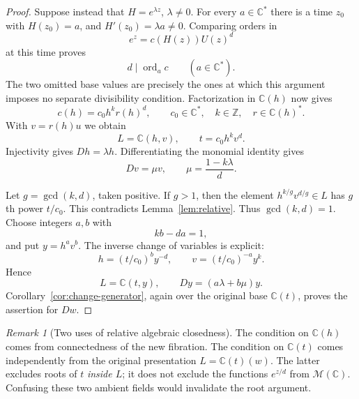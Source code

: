 \documentclass[11pt,reqno]{amsart}
\numberwithin{equation}{section}
\theoremstyle{definition}
\theoremstyle{remark}
\newtheorem{remark}[theorem]{Remark}
\newcommand{\C}{\mathbb C}
\newcommand{\Z}{\mathbb Z}
\newcommand{\MM}{\mathcal M}
\newcommand{\ord}{\operatorname{ord}}
\begin{document}
\begin{proof}
Suppose instead that $H=e^{\lambda z}$, $\lambda\ne0$. For every
$a\in\C^*$ there is a time $z_0$ with $H(z_0)=a$, and
$H'(z_0)=\lambda a\ne0$. Comparing orders in
\[
 e^z=c(H(z))U(z)^d
\]
at this time proves
\begin{equation}
 d\mid\ord_a c\qquad(a\in\C^*).
 \label{eq:multiplicative-divisibility}
\end{equation}
The two omitted base values are precisely the ones at which this
argument imposes no separate divisibility condition. Factorization in
$\C(h)$ now gives
\begin{equation}
 c(h)=c_0h^k r(h)^d,
 \qquad c_0\in\C^*,\quad k\in\Z,
 \quad r\in\C(h)^*.
 \label{eq:monomial-coefficient}
\end{equation}
With $v=r(h)u$ we obtain
\begin{equation}
 L=\C(h,v),\qquad t=c_0h^kv^d.
 \label{eq:monomial-map}
\end{equation}
Injectivity gives $Dh=\lambda h$. Differentiating the monomial
identity gives
\begin{equation}
 Dv=\mu v,\qquad \mu=\frac{1-k\lambda}{d}.
 \label{eq:diagonal-derivation}
\end{equation}

Let $g=\gcd(k,d)$, taken positive. If $g>1$, then the element
$h^{k/g}v^{d/g}\in L$ has $g$th power $t/c_0$. This contradicts
Lemma~\ref{lem:relative}. Thus $\gcd(k,d)=1$.
Choose integers $a,b$ with
\begin{equation}
 kb-da=1,
 \label{eq:bezout}
\end{equation}
and put $y=h^av^b$. The inverse change of variables is explicit:
\begin{equation}
 h=(t/c_0)^b y^{-d},\qquad
 v=(t/c_0)^{-a}y^k.
 \label{eq:inverse-monomial}
\end{equation}
Hence
\begin{equation}
 L=\C(t,y),\qquad Dy=(a\lambda+b\mu)y.
 \label{eq:original-base-product}
\end{equation}
Corollary~\ref{cor:change-generator}, again over the original base
$\C(t)$, proves the assertion for $Dw$.
\end{proof}

\begin{remark}[Two uses of relative algebraic closedness]
The condition on $\C(h)$ comes from connectedness of the new
fibration. The condition on $\C(t)$ comes independently from the
original presentation $L=\C(t)(w)$. The latter excludes roots of $t$
\emph{inside $L$}; it does not exclude the functions $e^{z/d}$ from
$\MM(\C)$. Confusing these two ambient fields would invalidate the
root argument.
\end{remark}
\end{document}

